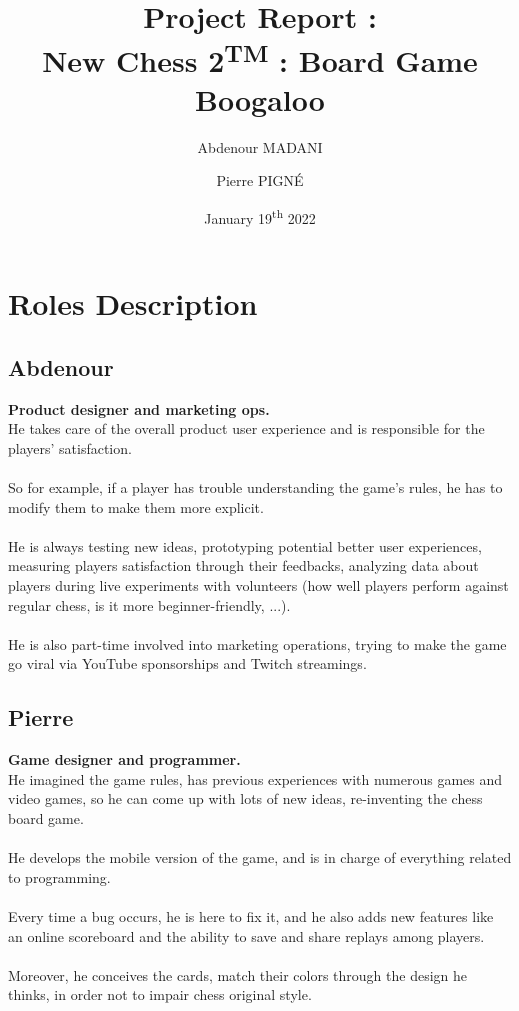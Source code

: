 \documentclass[12pt]{article}
\begin{document}
    
    \title{Project Report :\\\textbf{New Chess 2\textsuperscript{TM} : Board Game Boogaloo}}
    \author{Abdenour MADANI \and Pierre PIGNÉ}
    \date{January 19\textsuperscript{th} 2022}
    \maketitle
    \newpage
    
    \tableofcontents
    \newpage
    
    \section{Roles Description}
        \subsection{Abdenour}
            \textbf{Product designer and marketing ops.}
            \\He takes care of the overall product user experience and is responsible for the players' satisfaction.
            \\\\So for example, if a player has trouble understanding the game's rules, he has to modify them to make them more explicit. 
            \\\\He is always testing new ideas, prototyping potential better user experiences, measuring players satisfaction through their feedbacks, analyzing data about players during live experiments with volunteers (how well players perform against regular chess, is it more beginner-friendly, ...).
            \\\\He is also part-time involved into marketing operations, trying to make the game go viral via YouTube sponsorships and Twitch streamings.
            
        \subsection{Pierre}
            \textbf{Game designer and programmer.}
            \\He imagined the game rules, has previous experiences with numerous games and video games, so he can come up with lots of new ideas, re-inventing the chess board game.
            \\\\He develops the mobile version of the game, and is in charge of everything related to programming.
            \\\\Every time a bug occurs, he is here to fix it, and he also adds new features like an online scoreboard and the ability to save and share replays among players. 
            \\\\Moreover, he conceives the cards, match their colors through the design he thinks, in order not to impair chess original style.
    
\end{document}
